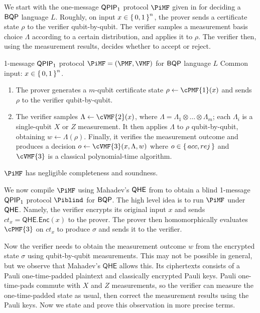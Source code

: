 We start with the one-message $\operatorname{\mathsf{QPIP}}_1$ protocol $\PiMF$ given in \cite{mf16} for deciding a $\operatorname{\mathsf{BQP}}$ language $L$.
Roughly, on input $x\in\set{0,1}^n$, the prover sends a certificate state $\rho$ to the verifier qubit-by-qubit.
The verifier samples a measurement basis choice $\Lambda$ according to a certain distribution, and applies it to $\rho$.
The verifier then, using the measurement results, decides whether to accept or reject.

\begin{protocol}{1-message $\operatorname{\mathsf{QPIP}}_1$ protocol $\PiMF = (\PMF, \VMF)$ for $\operatorname{\mathsf{BQP}}$ language $L$}
	\label{proto:BQP}
	Common input: $x\in\set{0,1}^n$. 
	\begin{enumerate}
		\item The prover generates a $m$-qubit certificate state $\rho\leftarrow\cPMF{1}(x)$ and sends $\rho$ to the verifier qubit-by-qubit.
		\item The verifier samples $\Lambda \leftarrow \cVMF{2}(x)$, where $\Lambda=\Lambda_1\otimes\ldots\otimes\Lambda_m$;
			each $\Lambda_i$ is a single-qubit $X$ or $Z$ measurement.
			It then applies $\Lambda$ to $\rho$ qubit-by-qubit, obtaining $w\leftarrow\Lambda(\rho)$.
			Finally, it verifies the measurement outcome and produces a decision $o\leftarrow\cVMF{3}(x, \Lambda, w)$ where $o\in\set{acc, rej}$ and $\cVMF{3}$ is a classical polynomial-time algorithm.
	\end{enumerate}
\end{protocol}
\begin{thm}
    $\PiMF$ has negligible completeness and soundness.
\end{thm}

We now compile $\PiMF$ using Mahadev's $\mathsf{QHE}$ from \cite{mahadev_qfhe} to obtain a blind 1-message $\operatorname{\mathsf{QPIP}}_1$ protocol $\Piblind$ for $\operatorname{\mathsf{BQP}}$.
The high level idea is to run $\PiMF$ under $\mathsf{QHE}$.
Namely, the verifier encrypts its original input $x$ and sends $ct_x=\mathsf{QHE.Enc}(x)$ to the prover.
The prover then homomorphically evaluates $\cPMF{3}$ on $ct_x$ to produce $\sigma$ and sends it to the verifier.

Now the verifier needs to obtain the measurement outcome $w$ from the encrypted state $\sigma$ using qubit-by-qubit measurements.
This may not be possible in general, but we observe that Mahadev's $\mathsf{QHE}$ allows this. 
Its ciphertexts consists of a Pauli one-time-padded plaintext and classically encrypted Pauli keys.
Pauli one-time-pads commute with $X$ and $Z$ measurements, so the verifier can measure the one-time-padded state as usual, then correct the measurement results using the Pauli keys.
Now we state and prove this observation in more precise terms.

